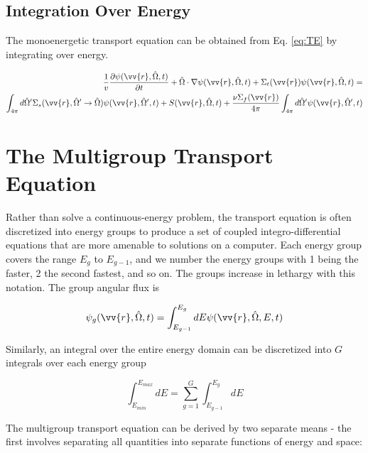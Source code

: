 \documentclass[10pt]{article}
\newcommand{\hO}{\hat{\Omega}}
\begin{document}
\begin{flushleft}
\subsection{Integration Over Energy}

The monoenergetic transport equation can be obtained from Eq. \eqref{eq:TE} by integrating over energy. 

\begin{equation}
\label{eq:TEMonoenergetic}
\begin{aligned}
\frac{1}{v} \frac{\partial\psi(\vv{r},\hO  ,t)}{\partial t} +
 \hO  \cdot\nabla\psi(\vv{r}, \hO  ,t) + 
 \Sigma_t(\vv{r})\psi(\vv{r}, \hO  ,t) = \\
\int_{4\pi}^{ } d\hO  ' \Sigma_s(\vv{r}, \hO  '\rightarrow\hO  )\psi(\vv{r}, \hO  ',t) + S(\vv{r}, \hO  ,t)+\frac{\nu\Sigma_f(\vv{r})}{4\pi} \int_{4\pi}^{} d\hO  '\psi(\vv{r},\hO  ',t)\\
\end{aligned}
\end{equation}

\section{The Multigroup Transport Equation}

Rather than solve a continuous-energy problem, the transport equation is often discretized into energy groups to produce a set of coupled integro-differential equations that are more amenable to solutions on a computer. Each energy group covers the range \(E_g\) to \(E_{g-1}\), and we number the energy groups with 1 being the faster, 2 the second fastest, and so on. The groups increase in lethargy with this notation. The group angular flux is

\begin{equation}
\label{eq:GrpAngularFlux}
\psi_g (\vv{r}, \hO  ,t) = \int_{E_{g-1}}^{E_g} dE \psi(\vv{r}, \hO  ,E, t)
\end{equation}

Similarly, an integral over the entire energy domain can be discretized into \(G\) integrals over each energy group

\begin{equation}
\label{eq:dEMultiGroup}
\int_{E_{min}}^{E_{max}}dE = \sum_{g=1}^{G} \int_{E_{g-1}}^{E_g} dE
\end{equation}

The multigroup transport equation can be derived by two separate means - the first involves separating all quantities into separate functions of energy and space:


\end{flushleft}
\end{document}
